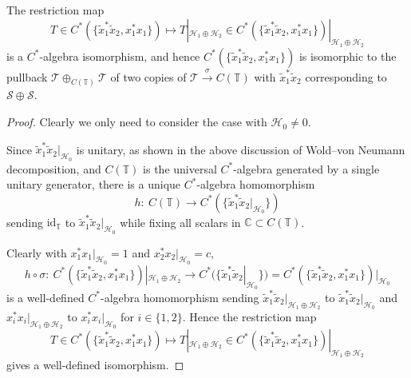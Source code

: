 \documentclass[pdftex]{sigma}
\begin{document}
\begin{theorem}\label{restriction} The restriction map
\[
T\in C^{\ast}( \{ \tilde{x}_{1}^{\ast}\tilde{x}_{2},x_{1}^{\ast
}x_{1} \} ) \mapsto T|_{\mathcal{H}_{1}\oplus\mathcal{H}_{2}}\in
C^{\ast}( \{ \tilde{x}_{1}^{\ast}\tilde{x}_{2},x_{1}^{\ast}%
x_{1} \} ) |_{\mathcal{H}_{1}\oplus\mathcal{H}_{2}}%
\]
is a $C^*$-algebra isomorphism, and hence $C^{\ast}( \{ \tilde{x}%
_{1}^{\ast}\tilde{x}_{2},x_{1}^{\ast}x_{1} \} ) $ is isomorphic
to the pullback $\mathcal{T}\oplus_{C(\mathbb{T}) }\mathcal{T}$
of two copies of $\mathcal{T}\overset{\sigma}{\rightarrow}C(
\mathbb{T}) $ with $\tilde{x}_{1}^{\ast}\tilde{x}_{2}$ corresponding to
$\mathcal{S}\oplus\mathcal{S}$.
\end{theorem}
\begin{proof} Clearly we only need to consider the case with $\mathcal{H}_{0}\neq0$.

Since $\tilde{x}_{1}^{\ast}\tilde{x}_{2}|_{\mathcal{H}_{0}}$ is unitary, as
shown in the above discussion of Wold--von Neumann decomposition, and $C(
\mathbb{T}) $ is the universal $C^*$-algebra generated by a single unitary
generator, there is a unique $C^*$-algebra homomorphism
\[
h\colon \ C(\mathbb{T}) \rightarrow C^{\ast}( \{ \tilde
{x}_{1}^{\ast}\tilde{x}_{2}|_{\mathcal{H}_{0}} \} )
\]
sending $\mathrm{id}_{\mathbb{T}}$ to $\tilde{x}_{1}^{\ast}\tilde{x}%
_{2}|_{\mathcal{H}_{0}}$ while fixing all scalars in $\mathbb{C}\subset
C(\mathbb{T}) $.

Clearly with $x_{1}^{\ast}x_{1}|_{\mathcal{H}_{0}}=1$ and $x_{2}^{\ast}%
x_{2}|_{\mathcal{H}_{0}}=c$,
\[
h\circ\sigma\colon \ C^{\ast}( \{ \tilde{x}_{1}^{\ast}\tilde{x}_{2}%
,x_{1}^{\ast}x_{1} \} ) |_{\mathcal{H}_{1}\oplus\mathcal{H}_{2}%
}\rightarrow C^{\ast}( \{ \tilde{x}_{1}^{\ast}\tilde{x}%
_{2}|_{\mathcal{H}_{0}} \} ) =C^{\ast}( \{ \tilde
{x}_{1}^{\ast}\tilde{x}_{2},x_{1}^{\ast}x_{1} \} ) |_{\mathcal{H}_{0}}
\]
is a well-defined $C^*$-algebra homomorphism sending $\tilde{x}_{1}^{\ast}%
\tilde{x}_{2}|_{\mathcal{H}_{1}\oplus\mathcal{H}_{2}}$ to $\tilde{x}_{1}%
^{\ast}\tilde{x}_{2}|_{\mathcal{H}_{0}}$ and $x_{i}^{\ast}x_{i}|_{\mathcal{H}%
_{1}\oplus\mathcal{H}_{2}}$ to $x_{i}^{\ast}x_{i}|_{\mathcal{H}_{0}}$ for
$i\in \{ 1,2 \} $. Hence the restriction map
\[
T\in C^{\ast}( \{ \tilde{x}_{1}^{\ast}\tilde{x}_{2},x_{1}^{\ast
}x_{1} \} ) \mapsto T|_{\mathcal{H}_{1}\oplus\mathcal{H}_{2}}\in
C^{\ast}( \{ \tilde{x}_{1}^{\ast}\tilde{x}_{2},x_{1}^{\ast}%
x_{1} \} ) |_{\mathcal{H}_{1}\oplus\mathcal{H}_{2}}
\]
gives a well-defined isomorphism.
\end{proof}
\end{document}
